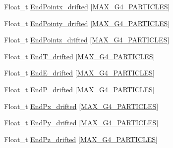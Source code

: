 \begin{DoxyCompactItemize}
\item 
Float\-\_\-t \hyperlink{classanatree_a9615bb4900d6867be708a7400b2230ab}{End\-Pointx\-\_\-drifted} \mbox{[}\hyperlink{anatree__core__v09410002__orig_8h_aa5cbba5cc53c011e88805f38503de894}{M\-A\-X\-\_\-\-G4\-\_\-\-P\-A\-R\-T\-I\-C\-L\-E\-S}\mbox{]}
\item 
Float\-\_\-t \hyperlink{classanatree_ac7e3593a03b5af3c4df44d88a6794460}{End\-Pointy\-\_\-drifted} \mbox{[}\hyperlink{anatree__core__v09410002__orig_8h_aa5cbba5cc53c011e88805f38503de894}{M\-A\-X\-\_\-\-G4\-\_\-\-P\-A\-R\-T\-I\-C\-L\-E\-S}\mbox{]}
\item 
Float\-\_\-t \hyperlink{classanatree_a217fa18cd35d47b127a0f3a64f4345b2}{End\-Pointz\-\_\-drifted} \mbox{[}\hyperlink{anatree__core__v09410002__orig_8h_aa5cbba5cc53c011e88805f38503de894}{M\-A\-X\-\_\-\-G4\-\_\-\-P\-A\-R\-T\-I\-C\-L\-E\-S}\mbox{]}
\item 
Float\-\_\-t \hyperlink{classanatree_ae38a505b83f0ea010a495284a49a2ae3}{End\-T\-\_\-drifted} \mbox{[}\hyperlink{anatree__core__v09410002__orig_8h_aa5cbba5cc53c011e88805f38503de894}{M\-A\-X\-\_\-\-G4\-\_\-\-P\-A\-R\-T\-I\-C\-L\-E\-S}\mbox{]}
\item 
Float\-\_\-t \hyperlink{classanatree_abba292c36386bd9049d34a386d697c8d}{End\-E\-\_\-drifted} \mbox{[}\hyperlink{anatree__core__v09410002__orig_8h_aa5cbba5cc53c011e88805f38503de894}{M\-A\-X\-\_\-\-G4\-\_\-\-P\-A\-R\-T\-I\-C\-L\-E\-S}\mbox{]}
\item 
Float\-\_\-t \hyperlink{classanatree_a40b0455d69597943e00c689a9874e837}{End\-P\-\_\-drifted} \mbox{[}\hyperlink{anatree__core__v09410002__orig_8h_aa5cbba5cc53c011e88805f38503de894}{M\-A\-X\-\_\-\-G4\-\_\-\-P\-A\-R\-T\-I\-C\-L\-E\-S}\mbox{]}
\item 
Float\-\_\-t \hyperlink{classanatree_aa1c7d9a1a958c85458dc90861d445445}{End\-Px\-\_\-drifted} \mbox{[}\hyperlink{anatree__core__v09410002__orig_8h_aa5cbba5cc53c011e88805f38503de894}{M\-A\-X\-\_\-\-G4\-\_\-\-P\-A\-R\-T\-I\-C\-L\-E\-S}\mbox{]}
\item 
Float\-\_\-t \hyperlink{classanatree_abda9c0eb8994f873be468bf6511172f2}{End\-Py\-\_\-drifted} \mbox{[}\hyperlink{anatree__core__v09410002__orig_8h_aa5cbba5cc53c011e88805f38503de894}{M\-A\-X\-\_\-\-G4\-\_\-\-P\-A\-R\-T\-I\-C\-L\-E\-S}\mbox{]}
\item 
Float\-\_\-t \hyperlink{classanatree_afcb865308ae3b6a8f831343c4578b784}{End\-Pz\-\_\-drifted} \mbox{[}\hyperlink{anatree__core__v09410002__orig_8h_aa5cbba5cc53c011e88805f38503de894}{M\-A\-X\-\_\-\-G4\-\_\-\-P\-A\-R\-T\-I\-C\-L\-E\-S}\mbox{]}

\end{DoxyCompactItemize}
